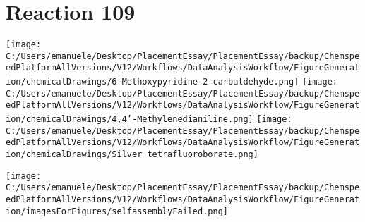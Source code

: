\documentclass{article}%
\begin{document}
\section*{Reaction 109}%
%
\begin{scheme}[H]%
\begin{minipage}{0.5\textwidth}%
\texttt{[image: C:/Users/emanuele/Desktop/PlacementEssay/PlacementEssay/backup/ChemspeedPlatformAllVersions/V12/Workflows/DataAnalysisWorkflow/FigureGeneration/chemicalDrawings/6-Methoxypyridine-2-carbaldehyde.png]}%
\texttt{[image: C:/Users/emanuele/Desktop/PlacementEssay/PlacementEssay/backup/ChemspeedPlatformAllVersions/V12/Workflows/DataAnalysisWorkflow/FigureGeneration/chemicalDrawings/4,4'-Methylenedianiline.png]}%
\texttt{[image: C:/Users/emanuele/Desktop/PlacementEssay/PlacementEssay/backup/ChemspeedPlatformAllVersions/V12/Workflows/DataAnalysisWorkflow/FigureGeneration/chemicalDrawings/Silver tetrafluoroborate.png]}%
\end{minipage}%
\begin{minipage}{0.5\textwidth}%
\begin{center}%
\texttt{[image: C:/Users/emanuele/Desktop/PlacementEssay/PlacementEssay/backup/ChemspeedPlatformAllVersions/V12/Workflows/DataAnalysisWorkflow/FigureGeneration/imagesForFigures/selfassemblyFailed.png]}%
\end{center}%
\end{minipage}%
\caption{Self-assembly of components 6, 17, with Silver(I) in a 3.0:1.5:1.0 molar ratio in CH$_3$CN at 60\textdegree C for 40h. These are the reagents (starting materials) for reaction 109.}%
\end{scheme}%
\end{document}
